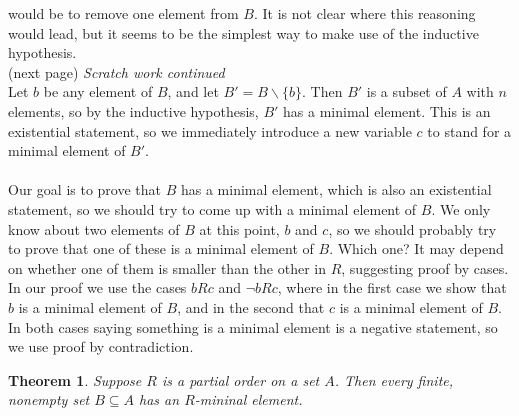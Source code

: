 \documentclass{report}
\newtheorem*{theorem}{Theorem}
\theoremstyle{definition}
\begin{document}
would be to remove one element from $B$. It is not clear where this reasoning would lead, but it seems to be the simplest way to make use of the inductive hypothesis.\\
(next page)\newpage
\noindent\textit{Scratch work continued}\\
Let $b$ be any element of $B$, and let $B'=B\backslash\{b\}$. Then $B'$ is a subset of $A$ with $n$ elements, so by the inductive hypothesis, $B'$ has a minimal element.
This is an existential statement, so we immediately introduce a new variable $c$ to stand for a minimal element of $B'$.\\
\vspace{1mm}\\
Our goal is to prove that $B$ has a minimal element, which is also an existential statement, so we should try to come up with a minimal element of $B$. We only know about two elements of $B$ at this
point, $b$ and $c$, so we should probably try to prove that one of these is a minimal element of $B$. Which one? It may depend on whether one of them is smaller than the other in $R$, suggesting 
proof by cases. In our proof we use the cases $bRc$ and $\neg bRc$, where in the first case
we show that $b$ is a minimal element of $B$, and in the second that $c$ is a minimal element of $B$. In both cases saying something is a minimal element is a negative statement, so we use proof
by contradiction.
\begin{theorem}
Suppose $R$ is a partial order on a set $A$. Then every finite, nonempty set $B\subseteq A$ has an $R$-mininal element.
\end{theorem}
\end{document}

